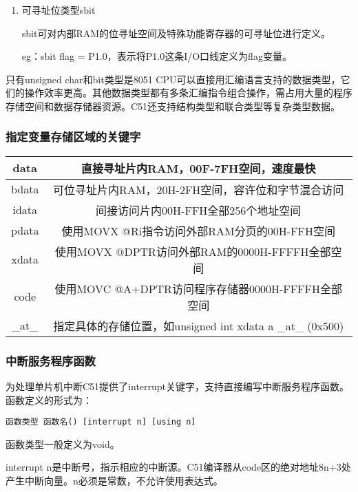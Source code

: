 \begin{spacing}{1.3}
\begin{enumerate}
\item 可寻址位类型sbit

sbit可对内部RAM的位寻址空间及特殊功能寄存器的可寻址位进行定义。

eg：sbit flag = P1.0，表示将P1.0这条I/O口线定义为flag变量。

\end{enumerate}

只有unsigned char和bit类型是8051 CPU可以直接用汇编语言支持的数据类型，它们的操作效率更高。其他数据类型都有多条汇编指令组合操作，需占用大量的程序存储空间和数据存储器资源。C51还支持结构类型和联合类型等复杂类型数据。

\subsubsection{指定变量存储区域的关键字}

\begin{table}[H]
\centering
\begin{tabular}{c|c}
\toprule
data & 直接寻址片内RAM，00F-7FH空间，速度最快 \\
\midrule
bdata & 可位寻址片内RAM，20H-2FH空间，容许位和字节混合访问 \\
\midrule
idata & 间接访问片内00H-FFH全部256个地址空间 \\
\midrule
pdata & 使用MOVX @Ri指令访问外部RAM分页的00H-FFH空间 \\
\midrule
xdata & 使用MOVX @DPTR访问外部RAM的0000H-FFFFH全部空间 \\
\midrule
code & 使用MOVC @A+DPTR访问程序存储器0000H-FFFFH全部空间 \\
\midrule
\_at\_ & 指定具体的存储位置，如unsigned int xdata a \_at\_ (0x500) \\
\bottomrule
\end{tabular}
\end{table}

\subsubsection{中断服务程序函数}

为处理单片机中断C51提供了interrupt关键字，支持直接编写中断服务程序函数。函数定义的形式为：

\begin{lstlisting}
函数类型 函数名() [interrupt n] [using n]
\end{lstlisting}

函数类型一般定义为void。

interrupt n是中断号，指示相应的中断源。C51编译器从code区的绝对地址8n+3处产生中断向量。n必须是常数，不允许使用表达式。


\end{spacing}
